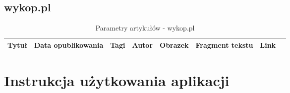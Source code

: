 \documentclass[12pt, titlepage]{article}
\begin{document}
		\subsection{wykop.pl} 
		\begin{table}[H]
			\centering
			\caption{Parametry artykułów - wykop.pl}
			\label{wykop_parametry}
			\begin{tabular}{ | C{1.5cm} | C{4cm} | C{1.5cm} | C{1.5cm} | C{1.5cm} | C{3cm} | C{1.5cm} | @{}m{0pt}@{}}
				\hline
				Tytuł & Data opublikowania & Tagi & Autor & Obrazek & Fragment tekstu & Link &\\[0.5cm]
				\hline
			\end{tabular}
		\end{table}
	\section{Instrukcja użytkowania aplikacji}
	
\end{document}
